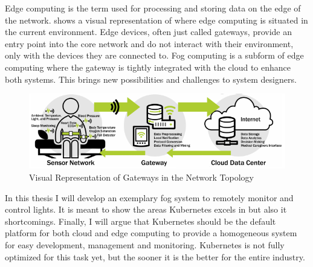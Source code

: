 Edge computing is the term used for processing and storing data on the edge of the network.  shows a visual representation of where edge computing is situated in the current environment. Edge devices, often just called gateways, provide an entry point into the core network and do not interact with their environment, only with the devices they are connected to. Fog computing is a subform of edge computing where the gateway is tightly integrated with the cloud to enhance both systems. This brings new possibilities and challenges to system designers.
\begin{figure}[ht]
    \centering
    \includegraphics[width=\textwidth]{figures/iotSetup.png}
    \caption{Visual Representation of Gateways in the Network Topology\cite{BoschIoT13:online}}
    \label{fig:boschIoTGatewaySetup}
\end{figure}

In this thesis I will develop an exemplary fog system to remotely monitor and control lights. It is meant to show the areas Kubernetes excels in but also it shortcomings. Finally, I will argue that Kubernetes should be the default platform for both cloud and edge computing to provide a homogeneous system for easy development, management and monitoring. Kubernetes is not fully optimized for this task yet, but the sooner it is the better for the entire industry.



% 


% 

% 